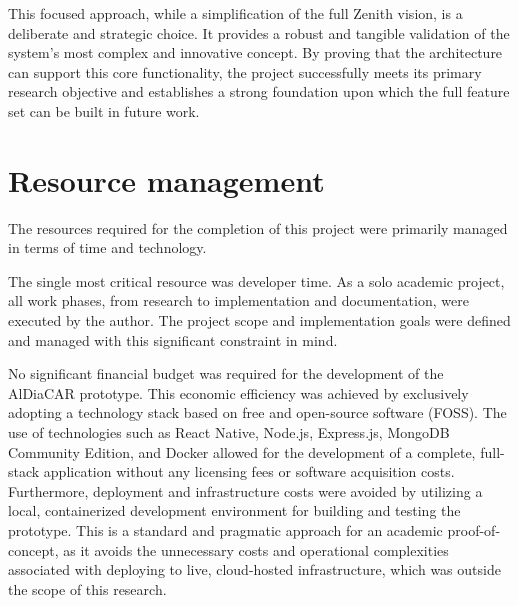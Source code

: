 \textgap

This focused approach, while a simplification of the full Zenith vision, is a deliberate and strategic choice. It provides a robust and tangible validation of the system's most complex and innovative concept. By proving that the architecture can support this core functionality, the project successfully meets its primary research objective and establishes a strong foundation upon which the full feature set can be built in future work.

\section{Resource management}

The resources required for the completion of this project were primarily managed in terms of time and technology.

\textgap

The single most critical resource was developer time. As a solo academic project, all work phases, from research to implementation and documentation, were executed by the author. The project scope and implementation goals were defined and managed with this significant constraint in mind.

\textgap

No significant financial budget was required for the development of the AlDiaCAR prototype. This economic efficiency was achieved by exclusively adopting a technology stack based on free and open-source software (FOSS). The use of technologies such as React Native, Node.js, Express.js, MongoDB Community Edition, and Docker allowed for the development of a complete, full-stack application without any licensing fees or software acquisition costs. Furthermore, deployment and infrastructure costs were avoided by utilizing a local, containerized development environment for building and testing the prototype. This is a standard and pragmatic approach for an academic proof-of-concept, as it avoids the unnecessary costs and operational complexities associated with deploying to live, cloud-hosted infrastructure, which was outside the scope of this research.
